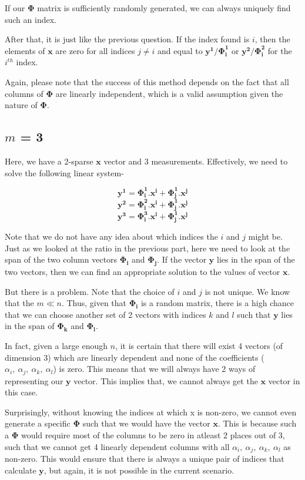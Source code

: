 \documentclass[a4paper,11pt]{article}
\numberwithin{definition}{section}
\numberwithin{mytheorem}{subsection}
\begin{document}
If our $\boldsymbol{\Phi}$ matrix is sufficiently randomly generated, we can always uniquely find such an index.

After that, it is just like the previous question. If the index found is $i$, then the elements of $\boldsymbol{x}$ are zero for all indices $j\neq i$ and equal to $\boldsymbol{y^1/\Phi_i^1}$ or $\boldsymbol{y^2/\Phi_i^2}$ for the $i^{th}$ index.

Again, please note that the success of this method depends on the fact that all columns of $\boldsymbol{\Phi}$ are linearly independent, which is a valid assumption given the nature of $\boldsymbol{\Phi}$.

\subsection{$m$ = 3}

Here, we have a 2-sparse $\boldsymbol{x}$ vector and 3 measurements.
Effectively, we need to solve the following linear system-

$$\boldsymbol{y^1} = \boldsymbol{\Phi_i^1.x^i + \Phi_j^1.x^j}$$
$$\boldsymbol{y^2} = \boldsymbol{\Phi_i^2.x^i + \Phi_j^1.x^j}$$
$$\boldsymbol{y^3} = \boldsymbol{\Phi_i^3.x^i + \Phi_j^1.x^j}$$

Note that we do not have any idea about which indices the $i$ and $j$ might be.\\
Just as we looked at the ratio in the previous part, here we need to look at the span of the two column vectors $\boldsymbol{\Phi_i}$ and $\boldsymbol{\Phi_j}$. If the vector $\boldsymbol{y}$ lies in the span of the two vectors, then we can find an appropriate solution to the values of vector $\boldsymbol{x}$.

But there is a problem. Note that the choice of $i$ and $j$ is not unique. We know that the $m \ll n$. Thus, given that $\boldsymbol{\Phi_i}$ is a random matrix, there is a high chance that we can choose another set of 2 vectors with indices $k$ and $l$ such that $\boldsymbol{y}$ lies in the span of $\boldsymbol{\Phi_k}$ and $\boldsymbol{\Phi_l}$.

In fact, given a large enough $n$, it is certain that there will exist 4 vectors (of dimension 3) which are linearly dependent and none of the coefficients
($\alpha_i,~\alpha_j,~\alpha_k,~\alpha_l$) is zero. This means that we will always have 2 ways of representing our $\boldsymbol{y}$ vector. This implies that, we cannot always get the $\boldsymbol{x}$ vector in this case.

Surprisingly, without knowing the indices at which x is non-zero, we cannot even generate a specific $\boldsymbol{\Phi}$ such that we would have the vector $\boldsymbol{x}$. This is because such a $\boldsymbol{\Phi}$ would require most of the columns to be zero in atleast 2 places out of 3, such that we cannot get 4 linearly dependent columns with all $\alpha_i,~\alpha_j,~\alpha_k,~\alpha_l$ as non-zero. This would ensure that there is always a unique pair of indices that calculate $\boldsymbol{y}$, but again, it is not possible in the current scenario.
\end{document}
